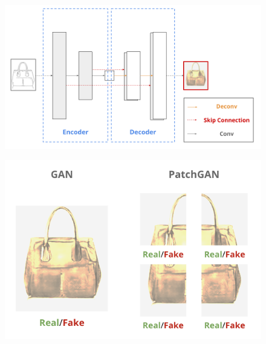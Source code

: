 \begin{figure}[b]
\centering
\begin{minipage}[b]{0.48\columnwidth}
\centering
\includegraphics[width=\columnwidth]{figure/u-net.png}
\label{fig:u-net}
\end{minipage}
\begin{minipage}[b]{0.48\columnwidth}
\centering
\includegraphics[width=\columnwidth]{figure/patchgan.png}
\label{fig:patchgan}
\end{minipage}
\caption[Pix2pixの生成モデルと識別モデル]{}
\end{figure}